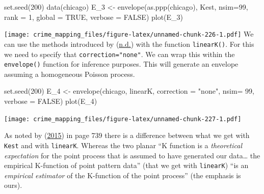 \documentclass[
  krantz2]{krantz}
\makeatletter
\newenvironment{Shaded}{\begin{snugshade}}{\end{snugshade}}
\newcommand{\AttributeTok}[1]{\textcolor[rgb]{0.61,0.61,0.61}{#1}}
\newcommand{\ConstantTok}[1]{\textcolor[rgb]{0,0,0}{#1}}
\newcommand{\DecValTok}[1]{\textcolor[rgb]{0.06,0.06,0.06}{#1}}
\newcommand{\FunctionTok}[1]{\textcolor[rgb]{0,0,0}{#1}}
\newcommand{\NormalTok}[1]{#1}
\newcommand{\OtherTok}[1]{\textcolor[rgb]{0.37,0.37,0.37}{#1}}
\newcommand{\StringTok}[1]{\textcolor[rgb]{0.5,0.5,0.5}{#1}}
\newenvironment{kframe}{%
\medskip{}
\setlength{\fboxsep}{.8em}
 \def\at@end@of@kframe{}%
 \ifinner\ifhmode%
  \def\at@end@of@kframe{\end{minipage}}%
  \begin{minipage}{\columnwidth}%
 \fi\fi%
 \def\FrameCommand##1{\hskip\@totalleftmargin \hskip-\fboxsep
 \colorbox{shadecolor}{##1}\hskip-\fboxsep
     \hskip-\linewidth \hskip-\@totalleftmargin \hskip\columnwidth}%
 \MakeFramed {\advance\hsize-\width
   \@totalleftmargin\z@ \linewidth\hsize
   \@setminipage}}%
 {\par\unskip\endMakeFramed%
 \at@end@of@kframe}
\renewenvironment{Shaded}{\begin{kframe}}{\end{kframe}}
\makeatother
\begin{document}
\begin{Shaded}
\begin{Highlighting}[]
\FunctionTok{set.seed}\NormalTok{(}\DecValTok{200}\NormalTok{)}
\FunctionTok{data}\NormalTok{(chicago)}
\NormalTok{E\_3 }\OtherTok{\textless{}{-}} \FunctionTok{envelope}\NormalTok{(}\FunctionTok{as.ppp}\NormalTok{(chicago), Kest, }\AttributeTok{nsim=}\DecValTok{99}\NormalTok{, }\AttributeTok{rank =} \DecValTok{1}\NormalTok{, }\AttributeTok{global =} \ConstantTok{TRUE}\NormalTok{,}
              \AttributeTok{verbose =} \ConstantTok{FALSE}\NormalTok{)}
\FunctionTok{plot}\NormalTok{(E\_3)}
\end{Highlighting}
\end{Shaded}

\texttt{[image: crime\_mapping\_files/figure-latex/unnamed-chunk-226-1.pdf]}
We can use the methods introduced by (\protect\hyperlink{ref-Okabe_2001}{n.d.}) with the function \texttt{linearK()}. For this we need to specify that \texttt{correction="none"}. We can wrap this within the \texttt{envelope()} function for inference purposes. This will generate an envelope assuming a homogeneous Poisson process.

\begin{Shaded}
\begin{Highlighting}[]
\FunctionTok{set.seed}\NormalTok{(}\DecValTok{200}\NormalTok{)}
\NormalTok{E\_4 }\OtherTok{\textless{}{-}} \FunctionTok{envelope}\NormalTok{(chicago, linearK, }\AttributeTok{correction =} \StringTok{"none"}\NormalTok{, }\AttributeTok{nsim=} \DecValTok{99}\NormalTok{, }\AttributeTok{verbose =} \ConstantTok{FALSE}\NormalTok{)}
\FunctionTok{plot}\NormalTok{(E\_4)}
\end{Highlighting}
\end{Shaded}

\texttt{[image: crime\_mapping\_files/figure-latex/unnamed-chunk-227-1.pdf]}

As noted by (\protect\hyperlink{ref-Baddeley_2016}{2015}) in page 739 there is a difference between what we get with \texttt{Kest} and with \texttt{linearK}. Whereas the two planar ``K function is a \emph{theoretical expectation} for the point process that is assumed to have generated our data\ldots{} the empirical K-function of point pattern data'' (that we get with \texttt{linearK}) ``is an \emph{empirical estimator} of the K-function of the point process'' (the emphasis is ours).
\end{document}

